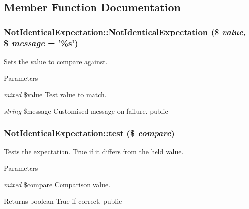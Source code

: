 \subsection{Member Function Documentation}
\hypertarget{class_not_identical_expectation_aa5ce1dd742efb85e079bd219234f0e99}{
\subsubsection[{NotIdenticalExpectation}]{\setlength{\rightskip}{0pt plus 5cm}NotIdenticalExpectation::NotIdenticalExpectation (\$ {\em value}, \/  \$ {\em message} = {\ttfamily '\%s'})}}
\label{class_not_identical_expectation_aa5ce1dd742efb85e079bd219234f0e99}
Sets the value to compare against. 
\begin{DoxyParams}{Parameters}
\item[{\em mixed}]\$value Test value to match. \item[{\em string}]\$message Customised message on failure.  public \end{DoxyParams}
\hypertarget{class_not_identical_expectation_a2e3d68e7804396cb418a9ef2d00c128e}{
\subsubsection[{test}]{\setlength{\rightskip}{0pt plus 5cm}NotIdenticalExpectation::test (\$ {\em compare})}}
\label{class_not_identical_expectation_a2e3d68e7804396cb418a9ef2d00c128e}
Tests the expectation. True if it differs from the held value. 
\begin{DoxyParams}{Parameters}
\item[{\em mixed}]\$compare Comparison value. \end{DoxyParams}
\begin{DoxyReturn}{Returns}
boolean True if correct.  public 
\end{DoxyReturn}


